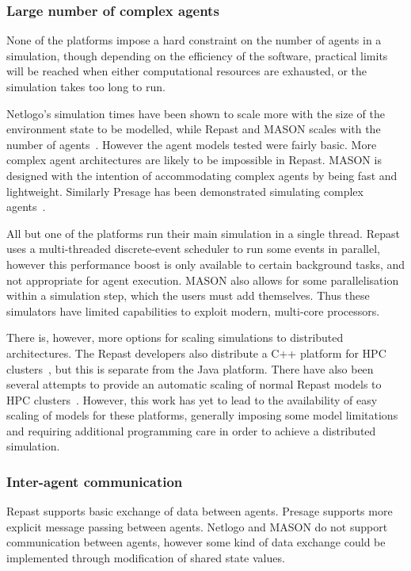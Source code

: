 \subsubsection*{Large number of complex agents}

None of the platforms impose a hard constraint on the number of agents in a simulation, though depending on the efficiency of the software, practical limits will be reached when either computational resources are exhausted, or the simulation takes too long to run.

Netlogo's simulation times have been shown to scale more with the size of the environment state to be modelled, while Repast and MASON scales with the number of agents~\citep{Railsback2006}.  However the agent models tested were fairly basic. More complex agent architectures are likely to be impossible in Repast. MASON is designed with the intention of accommodating complex agents by being fast and lightweight. Similarly Presage has been demonstrated simulating complex agents~\citep{Pitt2011}.

All but one of the platforms run their main simulation in a single thread. Repast uses a multi-threaded discrete-event scheduler to run some events in parallel, however this performance boost is only available to certain background tasks, and not appropriate for agent execution. MASON also allows for some parallelisation within a simulation step, which the users must add themselves. Thus these simulators have limited capabilities to exploit modern, multi-core processors.

There is, however, more options for scaling simulations to distributed architectures. The Repast developers also distribute a C++ platform for \ac{HPC} clusters~\citep{Collier2013}, but this is separate from the Java platform. There have also been several attempts to provide an automatic scaling of normal Repast models to \ac{HPC} clusters~\citep{Minson2008,Cicirelli2011}.
However, this work has yet to lead to the availability of easy scaling of models for these platforms, generally imposing some model limitations and requiring additional programming care in order to achieve a distributed simulation.

\subsubsection*{Inter-agent communication}

Repast supports basic exchange of data between agents. Presage supports more explicit message passing between agents. Netlogo and MASON do not support communication between agents, however some kind of data exchange could be implemented through modification of shared state values.

